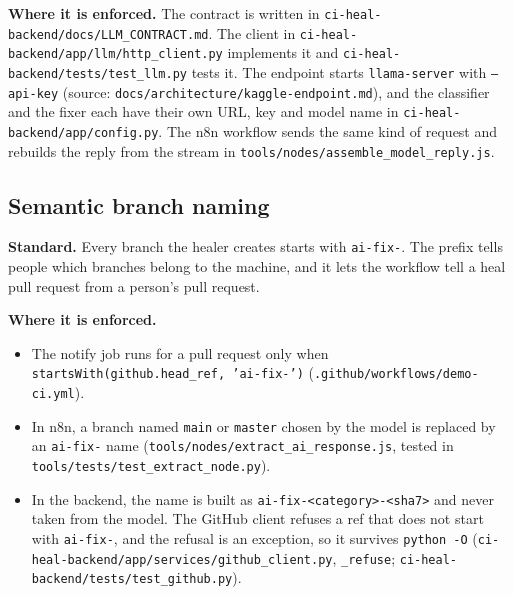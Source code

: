 \textbf{Where it is enforced.} The contract is written in \texttt{ci-heal-backend/\allowbreak{}docs/\allowbreak{}LLM\_\allowbreak{}CONTRACT.md}. The client in \texttt{ci-heal-backend/\allowbreak{}app/\allowbreak{}llm/\allowbreak{}http\_\allowbreak{}client.py} implements it and \texttt{ci-heal-backend/\allowbreak{}tests/\allowbreak{}test\_\allowbreak{}llm.py} tests it. The endpoint starts \texttt{llama-server} with \texttt{--api-key} (source: \texttt{docs/\allowbreak{}architecture/\allowbreak{}kaggle-endpoint.md}), and the classifier and the fixer each have their own URL, key and model name in \texttt{ci-heal-backend/\allowbreak{}app/\allowbreak{}config.py}. The n8n workflow sends the same kind of request and rebuilds the reply from the stream in \texttt{tools/\allowbreak{}nodes/\allowbreak{}assemble\_\allowbreak{}model\_\allowbreak{}reply.js}.

\subsection{Semantic branch naming}

\textbf{Standard.} Every branch the healer creates starts with \texttt{ai-fix-}. The prefix tells people which branches belong to the machine, and it lets the workflow tell a heal pull request from a person's pull request.

\textbf{Where it is enforced.}
\begin{itemize}
  \item The notify job runs for a pull request only when \texttt{startsWith(github.head\_ref, 'ai-fix-')} (\texttt{.github/\allowbreak{}workflows/\allowbreak{}demo-ci.yml}).
  \item In n8n, a branch named \texttt{main} or \texttt{master} chosen by the model is replaced by an \texttt{ai-fix-} name (\texttt{tools/\allowbreak{}nodes/\allowbreak{}extract\_\allowbreak{}ai\_\allowbreak{}response.js}, tested in \texttt{tools/\allowbreak{}tests/\allowbreak{}test\_\allowbreak{}extract\_\allowbreak{}node.py}).
  \item In the backend, the name is built as \texttt{ai-fix-<category>-<sha7>} and never taken from the model. The GitHub client refuses a ref that does not start with \texttt{ai-fix-}, and the refusal is an exception, so it survives \texttt{python -O} (\texttt{ci-heal-backend/\allowbreak{}app/\allowbreak{}services/\allowbreak{}github\_\allowbreak{}client.py}, \texttt{\_refuse}; \texttt{ci-heal-backend/\allowbreak{}tests/\allowbreak{}test\_\allowbreak{}github.py}).
\end{itemize}

